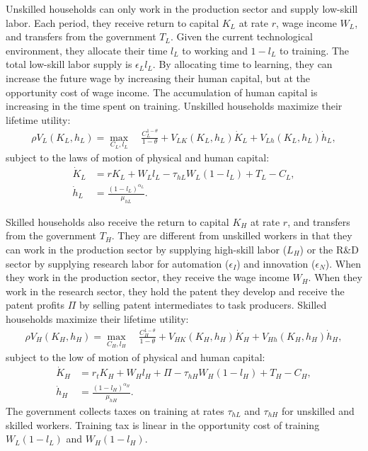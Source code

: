 \documentclass[12pt]{article}
\begin{document}
Unskilled households can only work in the production sector and supply low-skill labor. Each period, they receive return to capital $K_L$ at rate $r$, wage income $W_L$, and transfers from the government $T_L$. Given the current technological environment, they allocate their time $l_L$ to working and $1-l_L$ to training. The total low-skill labor supply is $\epsilon_Ll_L$. By allocating time to learning, they can increase the future wage by increasing their human capital, but at the opportunity cost of wage income. The accumulation of human capital is increasing in the time spent on training. Unskilled households maximize their lifetime utility: 
\begin{align*}
\rho V_L(K_L,h_L) = \max_{C_L,l_L} \quad \frac{C_L^{1-\theta}}{1-\theta}+V_{LK}(K_L,h_L)\dot{K}_L+V_{Lh}(K_L,h_L)\dot{h}_L,
\end{align*}
subject to the laws of motion of physical and human capital: 
\begin{align*}
\dot{K}_L &=r K_L+W_Ll_L-\tau_{hL}W_L(1-l_L)+T_L-C_L, \\
\dot{h}_L &= \frac{(1-l_L)^{\alpha_L}}{\mu_{hL}}.
\end{align*}

Skilled households also receive the return to capital $K_H$ at rate $r$, and transfers from the government $T_H$. They are different from unskilled workers in that they can work in the production sector by supplying high-skill labor ($L_H$) or the R\&D sector by supplying research labor for automation ($\epsilon_I$) and innovation ($\epsilon_N$). When they work in the production sector, they receive the wage income $W_H$. When they work in the research sector, they hold the patent they develop and receive the patent profits $\Pi$ by selling patent intermediates to task producers. Skilled households maximize their lifetime utility: 
\begin{align*}
\rho V_H(K_H,h_H) = \max_{C_H,l_H} \quad \frac{C_H^{1-\theta}}{1-\theta}+V_{HK}(K_H,h_H)\dot{K}_H+V_{Hh}(K_H,h_H)\dot{h}_H,
\end{align*}
subject to the low of motion of physical and human capital: 
\begin{align*}
\dot{K}_H &= r_t K_H +W_H l_H+\Pi-\tau_{hH}W_H(1-l_H)+T_H-C_H, \\
\dot{h}_H &= \frac{(1-l_H)^{\alpha_H}}{\mu_{hH}}.
\end{align*}
The government collects taxes on training at rates $\tau_{hL}$ and $\tau_{hH}$ for unskilled and skilled workers. Training tax is linear in the opportunity cost of training $W_L(1-l_L)$ and $W_H(1-l_H)$. 
\end{document}
